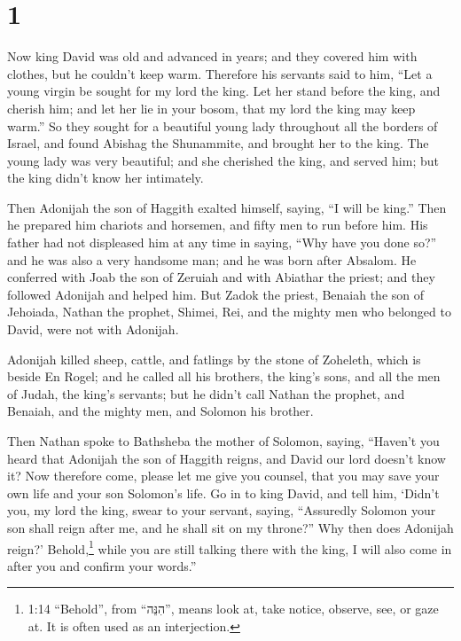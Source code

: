 \hypertarget{section}{%
\section{1}\label{section}}

 Now king David was old and advanced in years; and they
covered him with clothes, but he couldn't keep warm. 
Therefore his servants said to him, ``Let a young virgin be sought for
my lord the king. Let her stand before the king, and cherish him; and
let her lie in your bosom, that my lord the king may keep warm.''
 So they sought for a beautiful young lady throughout all
the borders of Israel, and found Abishag the Shunammite, and brought her
to the king.  The young lady was very beautiful; and she
cherished the king, and served him; but the king didn't know her
intimately.

 Then Adonijah the son of Haggith exalted himself, saying,
``I will be king.'' Then he prepared him chariots and horsemen, and
fifty men to run before him.  His father had not displeased
him at any time in saying, ``Why have you done so?'' and he was also a
very handsome man; and he was born after Absalom.  He
conferred with Joab the son of Zeruiah and with Abiathar the priest; and
they followed Adonijah and helped him.  But Zadok the
priest, Benaiah the son of Jehoiada, Nathan the prophet, Shimei, Rei,
and the mighty men who belonged to David, were not with Adonijah.

 Adonijah killed sheep, cattle, and fatlings by the stone of
Zoheleth, which is beside En Rogel; and he called all his brothers, the
king's sons, and all the men of Judah, the king's servants;
 but he didn't call Nathan the prophet, and Benaiah, and
the mighty men, and Solomon his brother.

 Then Nathan spoke to Bathsheba the mother of Solomon,
saying, ``Haven't you heard that Adonijah the son of Haggith reigns, and
David our lord doesn't know it?  Now therefore come, please
let me give you counsel, that you may save your own life and your son
Solomon's life.  Go in to king David, and tell him, `Didn't
you, my lord the king, swear to your servant, saying, ``Assuredly
Solomon your son shall reign after me, and he shall sit on my throne?''
Why then does Adonijah reign?'  Behold,\footnote{1:14
  ``Behold'', from ``הִנֵּה'', means look at, take notice, observe, see,
  or gaze at. It is often used as an interjection.} while you are still
talking there with the king, I will also come in after you and confirm
your words.''


